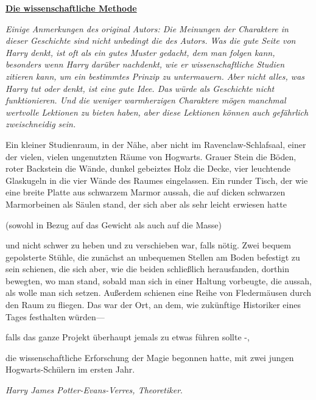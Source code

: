 

\hypertarget{die-wissenschaftliche-methode}{%

\textbf{\uline{Die wissenschaftliche Methode}}

\emph{Einige Anmerkungen des original Autors: Die Meinungen der Charaktere in dieser Geschichte sind nicht unbedingt die des Autors. Was die gute Seite von Harry denkt, ist oft als ein gutes Muster gedacht, dem man folgen kann, besonders wenn Harry darüber nachdenkt, wie er wissenschaftliche Studien zitieren kann, um ein bestimmtes Prinzip zu untermauern. Aber nicht alles, was Harry tut oder denkt, ist eine gute Idee. Das würde als Geschichte nicht funktionieren. Und die weniger warmherzigen Charaktere mögen manchmal wertvolle Lektionen zu bieten haben, aber diese Lektionen können auch gefährlich zweischneidig sein.}

Ein kleiner Studienraum, in der Nähe, aber nicht im Ravenclaw-Schlafsaal, einer der vielen, vielen ungenutzten Räume von Hogwarts. Grauer Stein die Böden, roter Backstein die Wände, dunkel gebeiztes Holz die Decke, vier leuchtende Glaskugeln in die vier Wände des Raumes eingelassen. Ein runder Tisch, der wie eine breite Platte aus schwarzem Marmor aussah, die auf dicken schwarzen Marmorbeinen als Säulen stand, der sich aber als sehr leicht erwiesen hatte

(sowohl in Bezug auf das Gewicht als auch auf die Masse)

und nicht schwer zu heben und zu verschieben war, falls nötig. Zwei bequem gepolsterte Stühle, die zunächst an unbequemen Stellen am Boden befestigt zu sein schienen, die sich aber, wie die beiden schließlich herausfanden, dorthin bewegten, wo man stand, sobald man sich in einer Haltung vorbeugte, die aussah, als wolle man sich setzen. Außerdem schienen eine Reihe von Fledermäusen durch den Raum zu fliegen. Das war der Ort, an dem, wie zukünftige Historiker eines Tages festhalten würden—

falls das ganze Projekt überhaupt jemals zu etwas führen sollte -,

die wissenschaftliche Erforschung der Magie begonnen hatte, mit zwei jungen Hogwarts-Schülern im ersten Jahr.

\emph{Harry James Potter-Evans-Verres, Theoretiker}.

}

